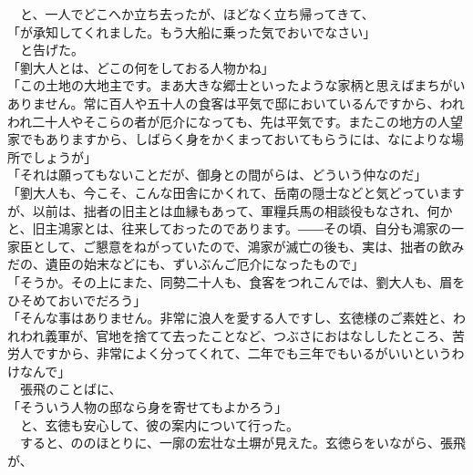 \documentclass[
  paper=a5,
  fontsize=10pt,
  jafontsize=9.5pt,
  tate,                  %
  open_bracket_pos=nibu, %
]{jlreq}
\begin{document}
　と、一人でどこへか立ち去ったが、ほどなく立ち帰ってきて、\\


「が承知してくれました。もう大船に乗った気でおいでなさい」\\


　と告げた。\\


「劉大人とは、どこの何をしておる人物かね」\\


「この土地の大地主です。まあ大きな郷士といったような家柄と思えばまちがいありません。常に百人や五十人の食客は平気で邸においているんですから、われわれ二十人やそこらの者が厄介になっても、先は平気です。またこの地方の人望家でもありますから、しばらく身をかくまっておいてもらうには、なによりな場所でしょうが」\\


「それは願ってもないことだが、御身との間がらは、どういう仲なのだ」\\


「劉大人も、今こそ、こんな田舎にかくれて、岳南の隠士などと気どっていますが、以前は、拙者の旧主とは血縁もあって、軍糧兵馬の相談役もなされ、何かと、旧主鴻家とは、往来しておったのであります。――その頃、自分も鴻家の一家臣として、ご懇意をねがっていたので、鴻家が滅亡の後も、実は、拙者の飲みだの、遺臣の始末などにも、ずいぶんご厄介になったもので」\\


「そうか。その上にまた、同勢二十人も、食客をつれこんでは、劉大人も、眉をひそめておいでだろう」\\


「そんな事はありません。非常に浪人を愛する人ですし、玄徳様のご素姓と、われわれ義軍が、官地を捨てて去ったことなど、つぶさにおはなししたところ、苦労人ですから、非常によく分ってくれて、二年でも三年でもいるがいいというわけなんで」\\


　張飛のことばに、\\


「そういう人物の邸なら身を寄せてもよかろう」\\


　と、玄徳も安心して、彼の案内について行った。\\


　すると、ののほとりに、一廓の宏壮な土塀が見えた。玄徳らをいながら、張飛が、\\
\end{document}
